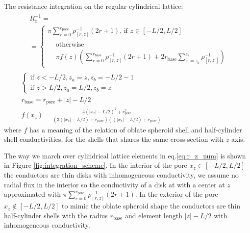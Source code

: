 \documentclass[10pt, a4paper]{article}
\begin{document}
\begin{multicols}{2}
The resistance integration on the regular cylindrical lattice:
\begin{gather}
    \label{eq:r_z_num}
    \begin{aligned} 
        &R_z^{-1} =
        \\
        &=\begin{cases}
             \pi \sum_{r=0}^{r_{\textrm{pore}}} \rho^{-1}_{[r,z]} (2r+1) \textrm{, if } z\in[-L/2,L/2]
             \\[4pt]
             \begin{aligned}
                &\textrm{otherwise}
                \\
                &\pi f(z) \left(\sum_{r=0}^{r_{\textrm{base}}} \rho^{-1}_{[r,z]} (2r+1) + 2 r_{\textrm{base}} \sum_{z^{\prime} = z_{a}}^{z_{b}}\rho^{-1}_{[r,z^{\prime}]}\right)
             \end{aligned}
        \end{cases}
    \end{aligned}
    \\
    \begin{cases}
        \textrm{if } z < -L/2, z_{a} = z, z_{b} = -L/2-1
        \\
        \textrm{if } z > L/2, z_{a} = L/2, z_{b} = z
    \end{cases}
    \\
    \label{eq:r_base}
    r_{\textrm{base}} = r_{\textrm{pore}} + |z| - L/2
    \\
    \label{eq:prefactor}
    f(x_z) = \frac{4(|x_z|-L/2)^2 + r_{\textrm{pore}}^2}{(3(|x_z|-L/2)+r_{\textrm{pore}})((|x_z|-L/2)+r_{\textrm{pore}})}
\end{gather}
where $f$ has a meaning of the relation of oblate spheroid shell and half-cylinder shell conductivities, for the shells that shares the same cross-section with $z$-axis.

The way we march over cylindrical lattice elements in eq.\ref{eq:r_z_num} is shown in Figure \ref{fig:integration_scheme}. 
In the interior of the pore $x_z \in [-L/2, L/2]$ the conductors are thin disks with inhomogeneous conductivity, we assume no radial flux in the interior so the conductivity of a disk at with a center at $z$ approximated with $\pi \sum_{r=0}^{r_{\textrm{pore}}} \rho^{-1}_{[r,z]} (2r+1)$.
In the exterior of the pore $x_z \notin [-L/2, L/2]$ to mimic the oblate spheroid shape the conductors are thin half-cylinder shells with the radius $r_{\textrm{base}}$ and element length $|z| - L/2$ with inhomogeneous conductivity.


\end{multicols}
\end{document}
